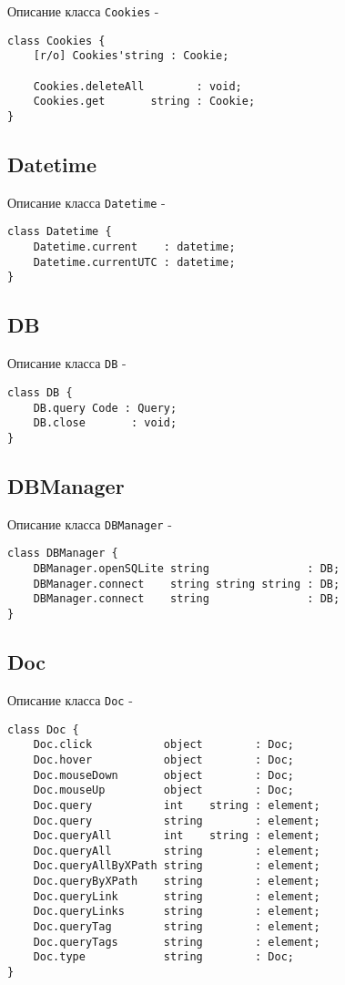\noindent Описание класса \texttt{Cookies} -
\begin{verbatim}
class Cookies {
    [r/o] Cookies'string : Cookie;

    Cookies.deleteAll        : void;
	Cookies.get       string : Cookie;
}
\end{verbatim}

\subsection{{\color{orange} Datetime}}

\noindent Описание класса \texttt{Datetime} -
\begin{verbatim}
class Datetime {
	Datetime.current    : datetime;
	Datetime.currentUTC : datetime;
}
\end{verbatim}

\subsection{{\color{orange} DB}}

\noindent Описание класса \texttt{DB} -
\begin{verbatim}
class DB {
	DB.query Code : Query;
	DB.close       : void;
}
\end{verbatim}

\subsection{{\color{orange} DBManager}}

\noindent Описание класса \texttt{DBManager} -
\begin{verbatim}
class DBManager {
    DBManager.openSQLite string               : DB;
    DBManager.connect    string string string : DB;
    DBManager.connect    string               : DB;
}
\end{verbatim}

\subsection{{\color{orange} Doc}}

\noindent Описание класса \texttt{Doc} -
\begin{verbatim}
class Doc {
	Doc.click           object        : Doc;
	Doc.hover           object        : Doc;
	Doc.mouseDown       object        : Doc;
	Doc.mouseUp         object        : Doc;
    Doc.query           int    string : element;
	Doc.query           string        : element;
	Doc.queryAll        int    string : element;
	Doc.queryAll        string        : element;
	Doc.queryAllByXPath string        : element;
	Doc.queryByXPath    string        : element;
	Doc.queryLink       string        : element;
	Doc.queryLinks      string        : element;
	Doc.queryTag        string        : element;
	Doc.queryTags       string        : element;
	Doc.type            string        : Doc;
}
\end{verbatim}

